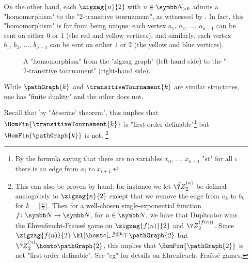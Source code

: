 \begin{example}
	On the other hand, each $\zigzag{n}{2}$ with $n\in\Np$ admits a "homomorphism" to the "$2$-transitive tournament", as witnessed by .%
	In fact, this "homomorphism" is far from being unique:
	each vertex $a_1,\,a_2,\,\dotsc,\,a_{n-1}$ can be sent on either $0$ or $1$
	(the red and yellow vertices), 
	and similarly, each vertex $b_1,\,b_2,\,\dotsc,\,b_{n-1}$ can be sent on either $1$ or $2$
	(the yellow and blue vertices).%
	\begin{figure}
		\centering 
		\begin{tikzpicture}
			
		\end{tikzpicture}
		\caption{\AP\label{fig:zigzag-graph-hom-T2}A "homomorphism" from the "zigzag graph" (left-hand side) to the "$2$-transitive tournament" (right-hand side).}
	\end{figure}
\end{example}

While $\pathGraph{k}$ and $\transitiveTournament{k}$ are similar structures,
one has "finite duality" and the other does not.

Recall that by "Atserias' theorem", this implies that
$\HomFin{\transitiveTournament{k}}$ is "first-order definable"\footnote{By the formula saying that
there are no variables $x_0$, $\dotsc$, $x_{k+1}$ "st" for all $i$ there is an edge from $x_i$ to $x_{i+1}$.} but $\HomFin{\pathGraph{k}}$ is not.%
\footnote{This can also be proven by hand: for 
instance we let $\tilde{\?Z}^{(n)}_2$ be defined analogously to $\zigzag{n}{2}$ except
that we remove the edge from $a_{k}$ to $b_k$ for $k = \lceil \frac{n}{2} \rceil$. 
Then for a well-chosen single-exponential function $f\colon \N \to \N$, for $n\in\N$,
we have that Duplicator wins the Ehrenfeucht-Fraïssé game on $\zigzag{f(n)}{2}$ and
$\tilde{\?Z}^{(f(n))}_2$. Since $\zigzag{f(n)}{2} \nothomto \pathGraph{2}$ but
$\tilde{\?Z}^{(n)}_2 \homto \pathGraph{2}$, this implies that $\HomFin{\pathGraph{2}}$ is not 
"first-order definable". See "eg" \cite[\S~3]{Kolaitis2007FiniteModelTheory} for details on
Ehrenfeucht-Fraïssé games.}


